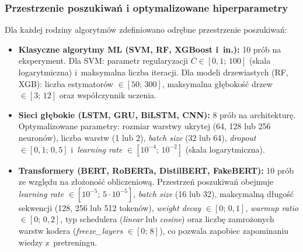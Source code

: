 \documentclass[oneside,polski,logo]{amuthesis}
\begin{document}
\subsubsection*{Przestrzenie poszukiwań i optymalizowane hiperparametry}

Dla każdej rodziny algorytmów zdefiniowano odrębne przestrzenie poszukiwań:

\begin{itemize}
    \item \textbf{Klasyczne algorytmy ML (SVM, RF, XGBoost i~in.):}
    10 prób na eksperyment. Dla SVM: parametr regularyzacji $C \in [0{,}1;\,100]$ (skala logarytmiczna) i~maksymalna liczba iteracji. Dla modeli drzewiastych (RF, XGB): liczba estymatorów $\in [50;\,300]$, maksymalna głębokość drzew $\in [3;\,12]$ oraz współczynnik uczenia.

    \item \textbf{Sieci głębokie (LSTM, GRU, BiLSTM, CNN):}
    8 prób na architekturę. Optymalizowane parametry: rozmiar warstwy ukrytej (64, 128 lub 256 neuronów), liczba warstw (1 lub 2), \textit{batch size} (32 lub 64), \textit{dropout} $\in [0{,}1;\,0{,}5]$ i~\textit{learning rate} $\in [10^{-4};\,10^{-2}]$ (skala logarytmiczna).

    \item \textbf{Transformery (BERT, RoBERTa, DistilBERT, FakeBERT):}
    10 prób ze względu na złożoność obliczeniową. Przestrzeń poszukiwań obejmuje \textit{learning rate} $\in [10^{-5};\,5{\cdot}10^{-5}]$, \textit{batch size} (16 lub 32), maksymalną długość sekwencji (128, 256 lub 512 tokenów), \textit{weight decay} $\in [0;\,0{,}1]$, \textit{warmup ratio} $\in [0;\,0{,}2]$, typ schedulera (\textit{linear} lub \textit{cosine}) oraz liczbę zamrożonych warstw kodera (\textit{freeze\_layers} $\in [0;\,8]$), co pozwala zapobiec zapominaniu wiedzy z~pretreningu.
\end{itemize}
\end{document}
